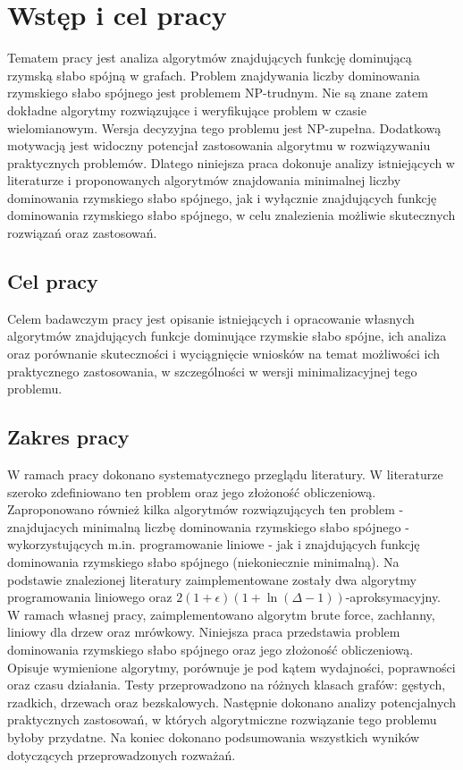 \chapter{Wstęp i cel pracy}
Tematem pracy jest analiza algorytmów znajdujących funkcję dominującą rzymską słabo spójną w grafach.
Problem znajdywania liczby dominowania rzymskiego słabo spójnego jest problemem NP-trudnym. Nie są znane zatem dokładne algorytmy rozwiązujące i weryfikujące problem w czasie wielomianowym. Wersja decyzyjna tego problemu jest NP-zupełna. Dodatkową motywacją jest widoczny potencjał zastosowania algorytmu w rozwiązywaniu praktycznych problemów. Dlatego niniejsza praca dokonuje analizy istniejących w literaturze i proponowanych algorytmów znajdowania minimalnej liczby dominowania rzymskiego słabo spójnego, jak i wyłącznie znajdujących funkcję dominowania rzymskiego słabo spójnego, w celu znalezienia możliwie skutecznych rozwiązań oraz zastosowań.

\section{Cel pracy}
Celem badawczym pracy jest opisanie istniejących i opracowanie własnych algorytmów znajdujących funkcje dominujące rzymskie słabo spójne, ich analiza oraz porównanie skuteczności i wyciągnięcie wniosków na temat możliwości ich praktycznego zastosowania, w szczególności w wersji minimalizacyjnej tego problemu.

\section{Zakres pracy}
W ramach pracy dokonano systematycznego przeglądu literatury. W literaturze szeroko zdefiniowano ten problem oraz jego złożoność obliczeniową. Zaproponowano również kilka algorytmów rozwiązujących ten problem - znajdujacych minimalną liczbę dominowania rzymskiego słabo spójnego - wykorzystujących m.in. programowanie liniowe - jak i znajdujących funkcję dominowania rzymskiego słabo spójnego (niekoniecznie minimalną). Na podstawie znalezionej literatury zaimplementowane zostały dwa algorytmy programowania liniowego oraz $2(1+\epsilon)(1 + \ln(\Delta - 1))$-aproksymacyjny. W ramach własnej pracy, zaimplementowano algorytm brute force, zachłanny, liniowy dla drzew oraz mrówkowy. Niniejsza praca przedstawia problem dominowania rzymskiego słabo spójnego oraz jego złożoność obliczeniową. Opisuje wymienione algorytmy, porównuje je pod kątem wydajności, poprawności oraz czasu działania. Testy przeprowadzono na różnych klasach grafów: gęstych, rzadkich, drzewach oraz bezskalowych. Następnie dokonano analizy potencjalnych praktycznych zastosowań, w których algorytmiczne rozwiązanie tego problemu byłoby przydatne. Na koniec dokonano podsumowania wszystkich wyników dotyczących przeprowadzonych rozważań.